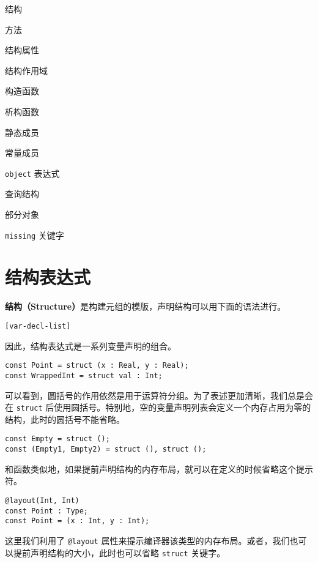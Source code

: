 \begin{introduction}
    \item 结构
    \item 方法
    \item 结构属性
    \item 结构作用域
    \item 构造函数
    \item 析构函数
    \item 静态成员
    \item 常量成员
    \item \lstinline!object! 表达式
    \item 查询结构
    \item 部分对象
    \item \lstinline!missing! 关键字
\end{introduction}

\section{结构表达式}

\textbf{结构（Structure）}是构建元组的模版，声明结构可以用下面的语法进行。

\begin{grammar}[结构表达式] \label{grm:struct-expression}
    \lstinline![var-decl-list]!
\end{grammar}

因此，结构表达式是一系列变量声明的组合。

\begin{lstlisting}
const Point = struct (x : Real, y : Real);
const WrappedInt = struct val : Int;
\end{lstlisting}

可以看到，圆括号的作用依然是用于运算符分组。为了表述更加清晰，我们总是会在 \lstinline!struct! 后使用圆括号。特别地，空的变量声明列表会定义一个内存占用为零的结构，此时的圆括号不能省略。

\begin{lstlisting}
const Empty = struct ();
const (Empty1, Empty2) = struct (), struct ();
\end{lstlisting}

和函数类似地，如果提前声明结构的内存布局，就可以在定义的时候省略这个提示符。

\begin{lstlisting}
@layout(Int, Int)
const Point : Type;
const Point = (x : Int, y : Int);
\end{lstlisting}

这里我们利用了 \lstinline!@layout! 属性来提示编译器该类型的内存布局。或者，我们也可以提前声明结构的大小，此时也可以省略 \lstinline!struct! 关键字。

